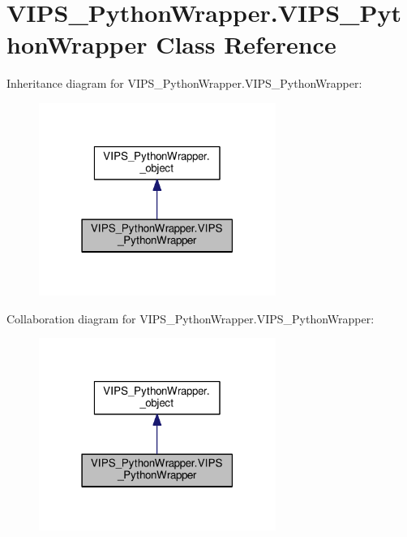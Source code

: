 \hypertarget{classVIPS__PythonWrapper_1_1VIPS__PythonWrapper}{}\section{V\+I\+P\+S\+\_\+\+Python\+Wrapper.\+V\+I\+P\+S\+\_\+\+Python\+Wrapper Class Reference}
\label{classVIPS__PythonWrapper_1_1VIPS__PythonWrapper}


Inheritance diagram for V\+I\+P\+S\+\_\+\+Python\+Wrapper.\+V\+I\+P\+S\+\_\+\+Python\+Wrapper\+:\nopagebreak
\begin{figure}[H]
\begin{center}
\leavevmode
\includegraphics[width=219pt]{classVIPS__PythonWrapper_1_1VIPS__PythonWrapper__inherit__graph}
\end{center}
\end{figure}


Collaboration diagram for V\+I\+P\+S\+\_\+\+Python\+Wrapper.\+V\+I\+P\+S\+\_\+\+Python\+Wrapper\+:\nopagebreak
\begin{figure}[H]
\begin{center}
\leavevmode
\includegraphics[width=219pt]{classVIPS__PythonWrapper_1_1VIPS__PythonWrapper__coll__graph}
\end{center}
\end{figure}
